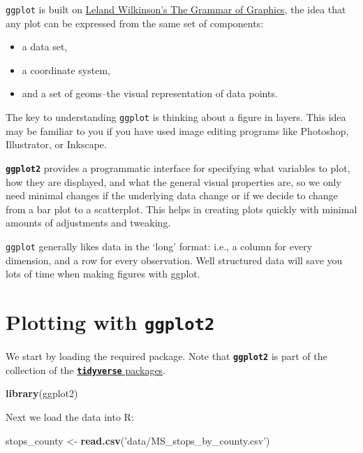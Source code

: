 \documentclass[]{book}
\newenvironment{Shaded}{\begin{snugshade}}{\end{snugshade}}
\newcommand{\KeywordTok}[1]{\textcolor[rgb]{0.13,0.29,0.53}{\textbf{#1}}}
\newcommand{\StringTok}[1]{\textcolor[rgb]{0.31,0.60,0.02}{#1}}
\newcommand{\NormalTok}[1]{#1}
\providecommand{\tightlist}{%
  \setlength{\itemsep}{0pt}\setlength{\parskip}{0pt}}
\theoremstyle{definition}
\theoremstyle{definition}
\theoremstyle{definition}
\theoremstyle{remark}
\begin{document}
\texttt{ggplot} is built on
\href{https://stanford.idm.oclc.org/login?url=http://www.myilibrary.com?id=46066}{Leland
Wilkinson's The Grammar of Graphics}, the idea that any plot can be
expressed from the same set of components:

\begin{itemize}
\tightlist
\item
  a data set,
\item
  a coordinate system,
\item
  and a set of geoms--the visual representation of data points.
\end{itemize}

The key to understanding \texttt{ggplot} is thinking about a figure in
layers. This idea may be familiar to you if you have used image editing
programs like Photoshop, Illustrator, or Inkscape.

\textbf{\texttt{ggplot2}} provides a programmatic interface for
specifying what variables to plot, how they are displayed, and what the
general visual properties are, so we only need minimal changes if the
underlying data change or if we decide to change from a bar plot to a
scatterplot. This helps in creating plots quickly with minimal amounts
of adjustments and tweaking.

\texttt{ggplot} generally likes data in the `long' format: i.e., a
column for every dimension, and a row for every observation. Well
structured data will save you lots of time when making figures with
ggplot.

\section{\texorpdfstring{Plotting with
\textbf{\texttt{ggplot2}}}{Plotting with ggplot2}}\label{plotting-with-ggplot2}

We start by loading the required package. Note that
\textbf{\texttt{ggplot2}} is part of the collection of the
\href{https://www.tidyverse.org}{\textbf{\texttt{tidyverse}} packages}.

\begin{Shaded}
\begin{Highlighting}[]
\KeywordTok{library}\NormalTok{(ggplot2)}
\end{Highlighting}
\end{Shaded}

Next we load the data into R:

\begin{Shaded}
\begin{Highlighting}[]
\NormalTok{stops_county <-}\StringTok{ }\KeywordTok{read.csv}\NormalTok{(}\StringTok{'data/MS_stops_by_county.csv'}\NormalTok{)}
\end{Highlighting}
\end{Shaded}
\end{document}
